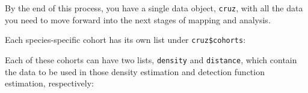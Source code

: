 \documentclass[
]{book}
\newenvironment{Shaded}{\begin{snugshade}}{\end{snugshade}}
\newcommand{\DataTypeTok}[1]{\textcolor[rgb]{0.13,0.29,0.53}{#1}}
\newcommand{\DecValTok}[1]{\textcolor[rgb]{0.00,0.00,0.81}{#1}}
\newcommand{\KeywordTok}[1]{\textcolor[rgb]{0.13,0.29,0.53}{\textbf{#1}}}
\newcommand{\NormalTok}[1]{#1}
\newcommand{\OperatorTok}[1]{\textcolor[rgb]{0.81,0.36,0.00}{\textbf{#1}}}
\newcommand{\OtherTok}[1]{\textcolor[rgb]{0.56,0.35,0.01}{#1}}
\newcommand{\StringTok}[1]{\textcolor[rgb]{0.31,0.60,0.02}{#1}}
\begin{document}
By the end of this process, you have a single data object, \texttt{cruz}, with all the data you need to move forward into the next stages of mapping and analysis.

\begin{Shaded}
\end{Shaded}

Each species-specific cohort has its own list under \texttt{cruz\$cohorts}:

\begin{Shaded}
\end{Shaded}

Each of these cohorts can have two lists, \texttt{density} and \texttt{distance}, which contain the data to be used in those density estimation and detection function estimation, respectively:

\begin{Shaded}
\end{Shaded}
\end{document}
